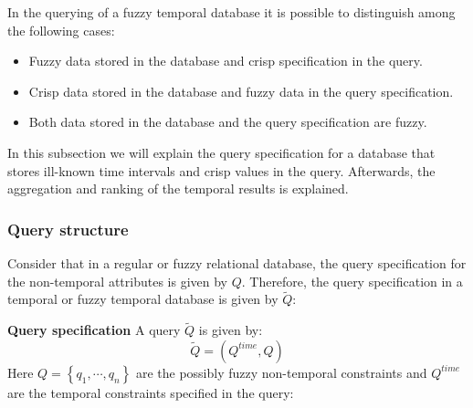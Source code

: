 In the querying of a fuzzy temporal database it is possible to distinguish among the following cases:

\begin{itemize}
\item
Fuzzy data stored in the database and crisp specification in the query.
\item
Crisp data stored in the database and fuzzy data in the query specification.
\item
Both data stored in the database and the query specification are fuzzy.
\end{itemize}
In this subsection we will explain the query specification for a database that stores ill-known time intervals and crisp values in the query. Afterwards, the aggregation and ranking of the temporal results is explained.

\subsubsection{Query structure}
Consider that in a regular or fuzzy relational database, the query specification for the non-temporal attributes is given by $Q$. Therefore, the query specification in a temporal or fuzzy temporal database is given by $\tilde{Q}$:

\begin{svgraybox}
\begin{definition}
\textbf{Query specification}
A query $\tilde{Q}$ is given by:
\begin{equation}
\label{eq:query-specification}
\tilde{Q} = \left( Q^{time}, Q \right)
\end{equation}
Here $Q = \left \lbrace q_1, \cdots, q_n \right \rbrace$ are the possibly fuzzy non-temporal constraints and $Q^{time}$ are the temporal constraints specified in the query:
\end{definition}
\end{svgraybox}


